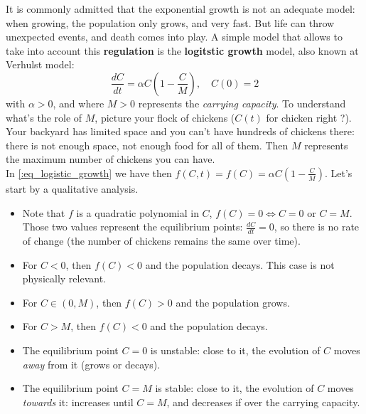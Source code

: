It is commonly admitted that the exponential growth is not an adequate model: when growing, the population only grows, and very fast. But life can throw unexpected events, and death comes into play. A simple model that allows to take into account this \textbf{regulation} is the \textbf{logitstic growth} model, also known at Verhulst model:
\begin{equation}\label{:eq_logistic_growth}
\displaystyle \frac{dC}{dt} = \alpha C \left( 1 - \frac{C}{M} \right)  ,\quad C(0) = 2 
\end{equation}
with $\alpha >0$, and where $M >0$ represents the \textit{carrying capacity}. To understand what's the role of $M$, picture your flock of chickens ($C(t)$ for chicken right ?). Your backyard has limited space and you can't have hundreds of chickens there: there is not enough space, not enough food for all of them. Then $M$ represents the maximum number of chickens you can have.\\
In \eqref{:eq_logistic_growth} we have then $f(C,t) =f(C) =  \alpha C \left( 1 - \frac{C}{M} \right)$. Let's start by a qualitative analysis.
\begin{itemize}
\item Note that $f$ is a quadratic polynomial in $C$, $f(C) = 0 \Longleftrightarrow C = 0$ or $C = M$. Those two values represent the equilibrium points: $\displaystyle \frac{dC}{dt}  = 0$, so there is no rate of change (the number of chickens remains the same over time).
\item For $C <0$, then  $f(C) <0$ and the population decays. This case is not physically relevant.
\item For $C \in (0,M)$, then $f(C) >0$ and the population grows.
\item For $C >M$, then  $f(C) <0$ and the population decays. 
\item The equilibrium point $C = 0$ is unstable: close to it, the evolution of $C$ moves \textit{away} from it (grows or decays).
\item The equilibrium point $C = M$ is stable: close to it, the evolution of $C$ moves \textit{towards} it: increases until $C = M$, and decreases if over the carrying capacity.
\end{itemize}

